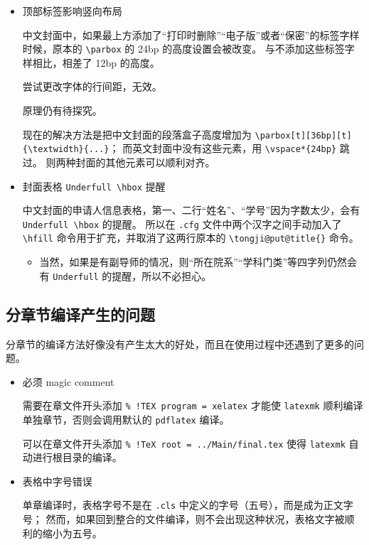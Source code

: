 \documentclass[../Main/thesis.tex]{subfiles}
\begin{document}
\begin{itemize}
\item
  顶部标签影响竖向布局

  中文封面中，如果最上方添加了``打印时删除''``电子版''或者``保密''的标签字样时候，原本的
  \texttt{\textbackslash{}parbox} 的 24bp 的高度设置会被改变。
  与不添加这些标签字样相比，相差了 12bp 的高度。

  尝试更改字体的行间距，无效。

  原理仍有待探究。

  现在的解决方法是把中文封面的段落盒子高度增加为
  \texttt{\textbackslash{}parbox{[}t{]}{[}36bp{]}{[}t{]}\{\textbackslash{}textwidth\}\{...\}}；
  而英文封面中没有这些元素，用 \texttt{\textbackslash{}vspace*\{24bp\}}
  跳过。 则两种封面的其他元素可以顺利对齐。
\item
  封面表格 \texttt{Underfull\ \textbackslash{}hbox} 提醒

  中文封面的申请人信息表格，第一、二行``姓名''、``学号''因为字数太少，会有
  \texttt{Underfull\ \textbackslash{}hbox} 的提醒。 所以在 \texttt{.cfg}
  文件中两个汉字之间手动加入了 \texttt{\textbackslash{}hfill}
  命令用于扩充，并取消了这两行原本的
  \texttt{\textbackslash{}tongji@put@title\{\}} 命令。

  \begin{itemize}
  \item
    当然，如果是有副导师的情况，则``所在院系''``学科门类''等四字列仍然会有
    \texttt{Underfull} 的提醒，所以不必担心。
  \end{itemize}
\end{itemize}

\subsection{分章节编译产生的问题}

分章节的编译方法好像没有产生太大的好处，而且在使用过程中还遇到了更多的问题。

\begin{itemize}
\item
  必须 magic comment

  需要在章文件开头添加 \texttt{\%\ !TEX\ program\ =\ xelatex} 才能使
  \texttt{latexmk} 顺利编译单独章节，否则会调用默认的 \texttt{pdflatex}
  编译。

  可以在章文件开头添加 \texttt{\%\ !TeX\ root\ =\ ../Main/final.tex}
  使得 \texttt{latexmk} 自动进行根目录的编译。
\item
  表格中字号错误

  单章编译时，表格字号不是在 \texttt{.cls}
  中定义的字号（五号），而是成为正文字号；
  然而，如果回到整合的文件编译，则不会出现这种状况，表格文字被顺利的缩小为五号。
\end{itemize}
\end{document}
